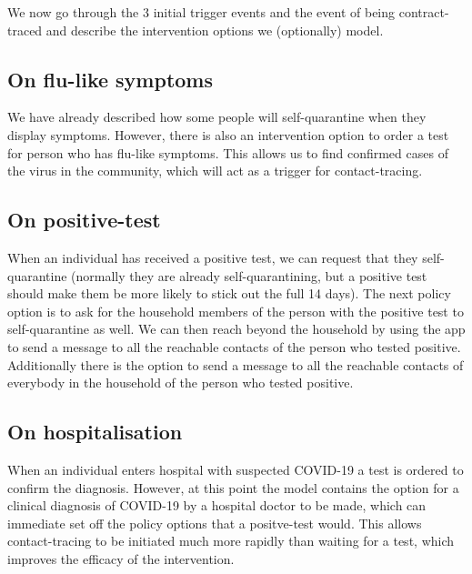 \documentclass[12pt, oneside]{amsart}   	%
\begin{document}
We now go through the 3 initial trigger events and the event of being contract-traced and describe the intervention options we (optionally) model.

\subsection{On flu-like symptoms} We have already described how some people will self-quarantine when they display symptoms. 
However, there is also an intervention option to order a test for person who has flu-like symptoms. 
This allows us to find confirmed cases of the virus in the community, which will act as a trigger for contact-tracing.

\subsection{On positive-test} 
When an individual has received a positive test, we can request that they self-quarantine (normally they are already self-quarantining, but a positive test should make them be more likely to stick out the full 14 days).
The next policy option is to ask for the household members of the person with the positive test to self-quarantine as well.
We can then reach beyond the household by using the app to send a message to all the reachable contacts of the person who tested positive.
Additionally there is the option to send a message to all the reachable contacts of everybody in the household of the person who tested positive. 

\subsection{On hospitalisation} 
When an individual enters hospital with suspected COVID-19 a test is ordered to confirm the diagnosis. 
However, at this point the model contains the option for a clinical diagnosis of COVID-19 by a hospital doctor to be made, which can immediate set off the policy options that a positve-test would.
This allows contact-tracing to be initiated much more rapidly than waiting for a test, which improves the efficacy of the intervention.
\end{document}
